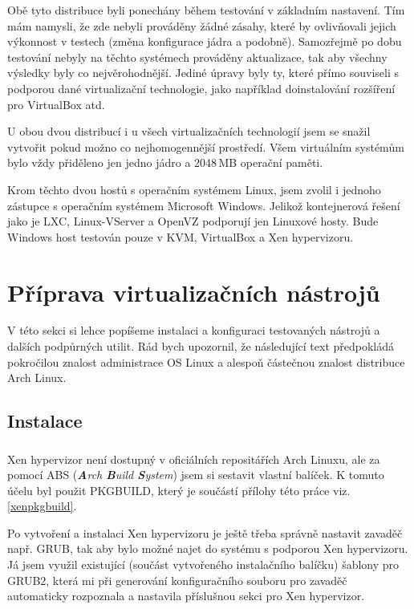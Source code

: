 Obě tyto distribuce byli ponechány během testování v základním nastavení. Tím mám namysli, že zde nebyli prováděny žádné zásahy, které by ovlivňovali jejich výkonnost v testech (změna konfigurace jádra a podobně). Samozřejmě po dobu testování nebyly na těchto systémech prováděny aktualizace, tak aby všechny výsledky byly co nejvěrohodnější. Jediné úpravy byly ty, které přímo souviseli s podporou dané virtualizační technologie, jako například doinstalování rozšíření pro VirtualBox atd.

U obou dvou distribucí i u všech virtualizačních technologií jsem se snažil vytvořit pokud možno co nejhomogennější prostředí. Všem virtuálním systémům bylo vždy přiděleno jen jedno jádro a 2048\,MB operační paměti.

Krom těchto dvou hostů s operačním systémem Linux, jsem zvolil i jednoho zástupce s operačním systémem Microsoft Windows. Jelikož kontejnerová řešení jako je LXC, Linux-VServer a OpenVZ podporují jen Linuxové hosty. Bude Windows host testován pouze v KVM, VirtualBox a Xen hypervizoru.

\section{Příprava virtualizačních nástrojů}
V této sekci si lehce popíšeme instalaci a konfiguraci testovaných nástrojů a dalších podpůrných utilit. Rád bych upozornil, že následující text předpokládá pokročilou znalost administrace OS Linux a alespoň částečnou znalost distribuce Arch Linux.
\subsection{Instalace}
\subsubsection{\xen}
Xen hypervizor není dostupný v oficiálních repositářích Arch Linuxu, ale za pomocí ABS (\emph{\textbf{A}rch \textbf{B}uild \textbf{S}ystem}) jsem si sestavit vlastní balíček. K tomuto účelu byl použit PKGBUILD, který je součástí přílohy této práce viz. \ref{xenpkgbuild}.

Po vytvoření a instalaci Xen hypervizoru je ještě třeba správně nastavit zavaděč např. GRUB, tak aby bylo možné najet do systému s podporou Xen hypervizoru. Já jsem využil existující (součást vytvořeného instalačního balíčku) šablony pro GRUB2, která mi při generování konfiguračního souboru pro zavaděč automaticky rozpoznala a nastavila příslušnou sekci pro Xen hypervizor.

